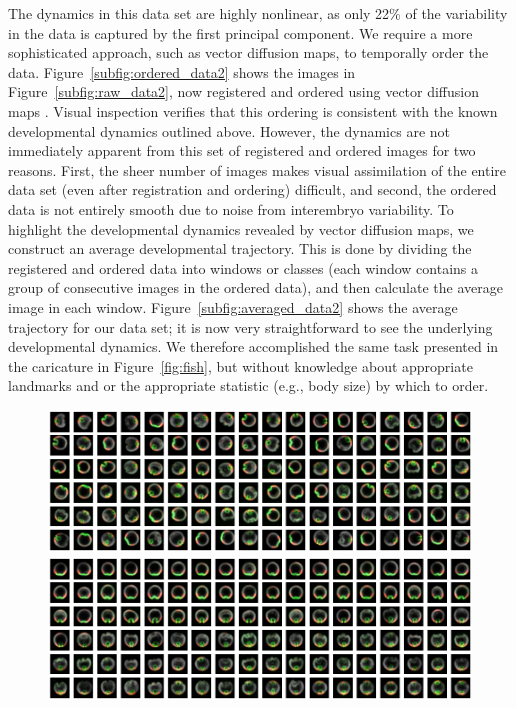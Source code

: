 \documentclass{pnastwo}
\begin{document}
\begin{article}
The dynamics in this data set are highly nonlinear, as only 22\% of the variability in the data is captured by the first principal component.
%
We require a more sophisticated approach, such as vector diffusion maps, to temporally order the data.
%
Figure~\ref{subfig:ordered_data2} shows the images in Figure~\ref{subfig:raw_data2}, now registered and ordered using vector diffusion maps \cite{singer2012vector}.
%
Visual inspection verifies that this ordering is consistent with the known developmental dynamics outlined above.
%
However, the dynamics are not immediately apparent from this set of registered and ordered images for two reasons.
%
First, the sheer number of images makes visual assimilation of the entire data set (even after registration and ordering) difficult, and
second, the ordered data is not entirely smooth due to noise from interembryo variability.
%
To highlight the developmental dynamics revealed by vector diffusion maps, we construct an average developmental trajectory.
%
This is done by dividing the registered and ordered data into windows or classes (each window contains a group of consecutive images in the ordered data), and then calculate the average image in each window.
%
Figure~\ref{subfig:averaged_data2} shows the average trajectory for our data set; it is now very straightforward to see the underlying developmental dynamics.
%
We therefore accomplished the same task presented in the caricature in Figure~\ref{fig:fish}, but without knowledge about appropriate landmarks and or the appropriate statistic (e.g., body size) by which to order. 


\begin{figure}[t]
\includegraphics[width=16.8cm]{raw_data2}

\vspace{0.2cm}
\includegraphics[width=16.8cm]{VDM_ordered}


\end{figure}
\end{article}
\end{document}

